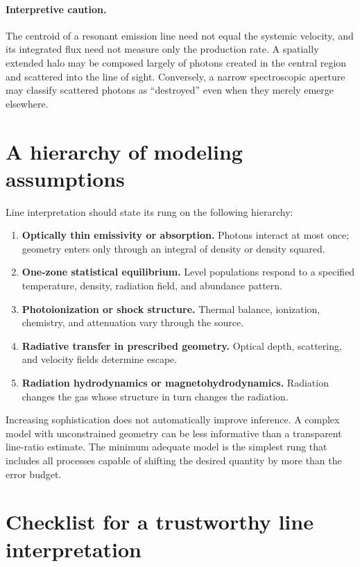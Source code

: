 \paragraph{Interpretive caution.}
The centroid of a resonant emission line need not equal the systemic velocity, and
its integrated flux need not measure only the production rate.  A spatially extended
halo may be composed largely of photons created in the central region and scattered
into the line of sight.  Conversely, a narrow spectroscopic aperture may classify
scattered photons as ``destroyed'' even when they merely emerge elsewhere.

\section{A hierarchy of modeling assumptions}

Line interpretation should state its rung on the following hierarchy:
\begin{enumerate}
 \item \textbf{Optically thin emissivity or absorption.}  Photons interact at most
 once; geometry enters only through an integral of density or density squared.
 \item \textbf{One-zone statistical equilibrium.}  Level populations respond to a
 specified temperature, density, radiation field, and abundance pattern.
 \item \textbf{Photoionization or shock structure.}  Thermal balance, ionization,
 chemistry, and attenuation vary through the source.
 \item \textbf{Radiative transfer in prescribed geometry.}  Optical depth,
 scattering, and velocity fields determine escape.
 \item \textbf{Radiation hydrodynamics or magnetohydrodynamics.}  Radiation changes
 the gas whose structure in turn changes the radiation.
\end{enumerate}
Increasing sophistication does not automatically improve inference.  A complex
model with unconstrained geometry can be less informative than a transparent
line-ratio estimate.  The minimum adequate model is the simplest rung that includes
all processes capable of shifting the desired quantity by more than the error budget.

\section{Checklist for a trustworthy line interpretation}

